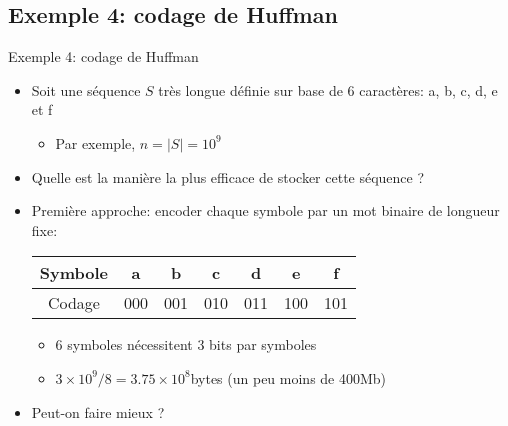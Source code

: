 \subsection{Exemple 4: codage de Huffman}

\begin{frame}{Exemple 4: codage de Huffman}
\begin{itemize}
\item Soit une séquence $S$ très longue définie sur base de 6 caractères: a, b, c, d, e et f
\begin{itemize}
\item Par exemple, $n=|S|=10^9$
\end{itemize}

\bigskip

\item Quelle est la manière la plus efficace de stocker cette séquence ?

\bigskip

\item Première approche: encoder chaque symbole par un mot binaire de
  longueur fixe:

\begin{center}
\begin{tabular}{c|cccccc}
Symbole & a & b & c & d & e & f\\
\hline
Codage & 000 & 001 & 010 & 011 & 100 & 101\\
\end{tabular}
\end{center}

\begin{itemize}
\item 6 symboles nécessitent 3 bits par symboles
\item $3\times 10^9/8=3.75\times 10^8$bytes (un peu moins de 400Mb)
\end{itemize}
\item Peut-on faire mieux ?
\end{itemize}

\end{frame}

